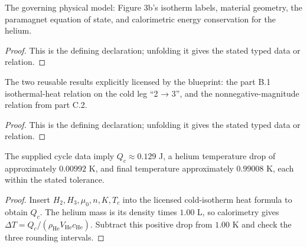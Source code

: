 \begin{definition}[GoverningLaws]
  \label{decl:physics:IPhO_2026_3_C_3:GoverningLaws}
  The governing physical model: Figure 3b's isotherm labels, material geometry, the paramagnet equation of state, and calorimetric energy conservation for the helium.
\end{definition}
\begin{proof}
  This is the defining declaration; unfolding it gives the stated typed data or relation.
\end{proof}

\begin{definition}[PreviousPartResults]
  \label{decl:physics:IPhO_2026_3_C_3:PreviousPartResults}
  The two reusable results explicitly licensed by the blueprint: the part B.1 isothermal-heat relation on the cold leg “2 → 3”, and the nonnegative-magnitude relation from part C.2.
\end{definition}
\begin{proof}
  This is the defining declaration; unfolding it gives the stated typed data or relation.
\end{proof}

\begin{theorem}
\label{thm:physics:IPhO_2026_3_C_3:target}
The supplied cycle data imply \(Q_c\approx0.129\) J, a helium temperature drop
of approximately \(0.00992\) K, and final temperature approximately
\(0.99008\) K, each within the stated tolerance.
\end{theorem}
\begin{proof}
Insert \(H_2,H_3,\mu_0,n,K,T_c\) into the licensed cold-isotherm heat formula
to obtain \(Q_c\).  The helium mass is its density times \(1.00\) L, so
calorimetry gives
\(\Delta T=Q_c/(\rho_{\mathrm{He}}V_{\mathrm{He}}c_{\mathrm{He}})\).
Subtract this positive drop from \(1.00\) K and check the three rounding
intervals.
\end{proof}
